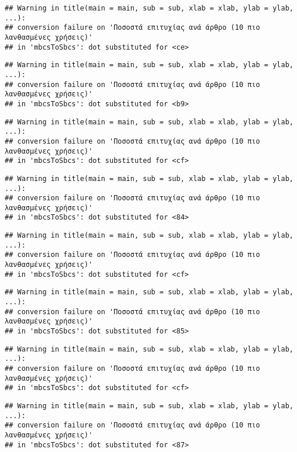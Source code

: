 \documentclass[
]{article}
\begin{document}
\begin{verbatim}
## Warning in title(main = main, sub = sub, xlab = xlab, ylab = ylab, ...):
## conversion failure on 'Ποσοστά επιτυχίας ανά άρθρο (10 πιο λανθασμένες χρήσεις)'
## in 'mbcsToSbcs': dot substituted for <ce>
\end{verbatim}

\begin{verbatim}
## Warning in title(main = main, sub = sub, xlab = xlab, ylab = ylab, ...):
## conversion failure on 'Ποσοστά επιτυχίας ανά άρθρο (10 πιο λανθασμένες χρήσεις)'
## in 'mbcsToSbcs': dot substituted for <b9>
\end{verbatim}

\begin{verbatim}
## Warning in title(main = main, sub = sub, xlab = xlab, ylab = ylab, ...):
## conversion failure on 'Ποσοστά επιτυχίας ανά άρθρο (10 πιο λανθασμένες χρήσεις)'
## in 'mbcsToSbcs': dot substituted for <cf>
\end{verbatim}

\begin{verbatim}
## Warning in title(main = main, sub = sub, xlab = xlab, ylab = ylab, ...):
## conversion failure on 'Ποσοστά επιτυχίας ανά άρθρο (10 πιο λανθασμένες χρήσεις)'
## in 'mbcsToSbcs': dot substituted for <84>
\end{verbatim}

\begin{verbatim}
## Warning in title(main = main, sub = sub, xlab = xlab, ylab = ylab, ...):
## conversion failure on 'Ποσοστά επιτυχίας ανά άρθρο (10 πιο λανθασμένες χρήσεις)'
## in 'mbcsToSbcs': dot substituted for <cf>
\end{verbatim}

\begin{verbatim}
## Warning in title(main = main, sub = sub, xlab = xlab, ylab = ylab, ...):
## conversion failure on 'Ποσοστά επιτυχίας ανά άρθρο (10 πιο λανθασμένες χρήσεις)'
## in 'mbcsToSbcs': dot substituted for <85>
\end{verbatim}

\begin{verbatim}
## Warning in title(main = main, sub = sub, xlab = xlab, ylab = ylab, ...):
## conversion failure on 'Ποσοστά επιτυχίας ανά άρθρο (10 πιο λανθασμένες χρήσεις)'
## in 'mbcsToSbcs': dot substituted for <cf>
\end{verbatim}

\begin{verbatim}
## Warning in title(main = main, sub = sub, xlab = xlab, ylab = ylab, ...):
## conversion failure on 'Ποσοστά επιτυχίας ανά άρθρο (10 πιο λανθασμένες χρήσεις)'
## in 'mbcsToSbcs': dot substituted for <87>
\end{verbatim}
\end{document}
